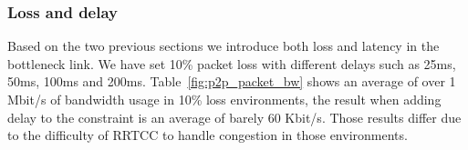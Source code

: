 
\subsubsection{Loss and delay}


Based on the two previous sections we introduce both loss and latency in the bottleneck link. We have set 10\% packet loss with different delays such as 25ms, 50ms, 100ms and 200ms. Table~\ref{fig:p2p_packet_bw} shows an average of over 1 Mbit/s of bandwidth usage in 10\% loss environments, the result when adding delay to the constraint is  an average of barely 60 Kbit/s. Those results differ due to the difficulty of RRTCC to handle congestion in those environments. 


